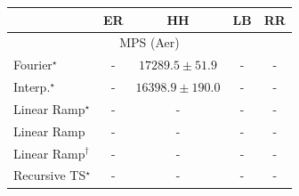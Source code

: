 \begin{tabular}{l|cccc|}
\toprule
            & ER & HH & LB & RR \\
\midrule
\multicolumn{5}{c}{\rule{0pt}{8pt}MPS (Aer)} \\
\midrule
Fourier$^\star$ & {\cellcolor[HTML]{000000}} \color[HTML]{F1F1F1} {\cellcolor{white}} \color{black} - & {\cellcolor[HTML]{4D004B}} \color[HTML]{F1F1F1} $17289.5\pm 51.9$ & {\cellcolor[HTML]{000000}} \color[HTML]{F1F1F1} {\cellcolor{white}} \color{black} - & {\cellcolor[HTML]{000000}} \color[HTML]{F1F1F1} {\cellcolor{white}} \color{black} - \\
Interp.$^\star$ & {\cellcolor[HTML]{000000}} \color[HTML]{F1F1F1} {\cellcolor{white}} \color{black} - & {\cellcolor[HTML]{F7FCFD}} \color[HTML]{000000} $16398.9\pm 190.0$ & {\cellcolor[HTML]{000000}} \color[HTML]{F1F1F1} {\cellcolor{white}} \color{black} - & {\cellcolor[HTML]{000000}} \color[HTML]{F1F1F1} {\cellcolor{white}} \color{black} - \\
Linear Ramp$^\star$ & {\cellcolor[HTML]{000000}} \color[HTML]{F1F1F1} {\cellcolor{white}} \color{black} - & {\cellcolor[HTML]{000000}} \color[HTML]{F1F1F1} {\cellcolor{white}} \color{black} - & {\cellcolor[HTML]{000000}} \color[HTML]{F1F1F1} {\cellcolor{white}} \color{black} - & {\cellcolor[HTML]{000000}} \color[HTML]{F1F1F1} {\cellcolor{white}} \color{black} - \\
Linear Ramp & {\cellcolor[HTML]{000000}} \color[HTML]{F1F1F1} {\cellcolor{white}} \color{black} - & {\cellcolor[HTML]{000000}} \color[HTML]{F1F1F1} {\cellcolor{white}} \color{black} - & {\cellcolor[HTML]{000000}} \color[HTML]{F1F1F1} {\cellcolor{white}} \color{black} - & {\cellcolor[HTML]{000000}} \color[HTML]{F1F1F1} {\cellcolor{white}} \color{black} - \\
Linear Ramp$^\dagger$ & {\cellcolor[HTML]{000000}} \color[HTML]{F1F1F1} {\cellcolor{white}} \color{black} - & {\cellcolor[HTML]{000000}} \color[HTML]{F1F1F1} {\cellcolor{white}} \color{black} - & {\cellcolor[HTML]{000000}} \color[HTML]{F1F1F1} {\cellcolor{white}} \color{black} - & {\cellcolor[HTML]{000000}} \color[HTML]{F1F1F1} {\cellcolor{white}} \color{black} - \\
Recursive TS$^\star$ & {\cellcolor[HTML]{000000}} \color[HTML]{F1F1F1} {\cellcolor{white}} \color{black} - & {\cellcolor[HTML]{000000}} \color[HTML]{F1F1F1} {\cellcolor{white}} \color{black} - & {\cellcolor[HTML]{000000}} \color[HTML]{F1F1F1} {\cellcolor{white}} \color{black} - & {\cellcolor[HTML]{000000}} \color[HTML]{F1F1F1} {\cellcolor{white}} \color{black} - \\

\end{tabular}
